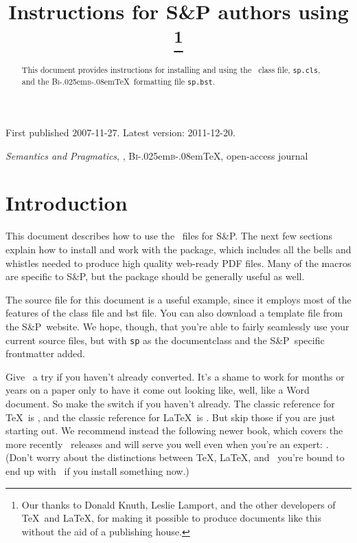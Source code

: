 \documentclass[lucida,final]{sp}
\title[S\&P instructions for \LaTeXe]{Instructions for S\&P authors using \LaTeXe%
  \thanks{Our thanks to Donald Knuth, Leslie
    Lamport, and the other developers of \TeX\ and \LaTeX, for making
    it possible to produce documents like this without the aid of a
    publishing house.}}
\author[von Fintel, Potts \& Shan]{%
  \spauthor{Kai von Fintel \\ \institute{Massachusetts Institute of Technology}} \AND
  \spauthor{Christopher Potts \\ \institute{University of Massachusetts Amherst}} \AND
  \spauthor{Chung-chieh Shan \\ \institute{Rutgers University}}%
}
\makeatletter
\newcommand{\BibTeX}{B{\textsc i\kern-.025em\textsc b}\kern-.08em\TeX}
\newcommand{\SandP}{S\&P\@}
\newcommand{\spfile}[1]{\texttt{#1}}
\makeatother
\begin{document}

\maketitle

\begin{mshistory}
First published 2007-11-27. Latest version: 2011-12-20.
\end{mshistory}

\begin{abstract}  
  This document provides instructions for installing and using the
  \LaTeXe\ class file, \spfile{sp.cls}, and the \BibTeX\ formatting
  file \spfile{sp.bst}.
\end{abstract}

\begin{keywords}
  \emph{Semantics and Pragmatics}, \LaTeXe, \BibTeX, open-access journal
\end{keywords}


\section{Introduction}

This document describes how to use the \LaTeXe\ files for \SandP.  The
next few sections explain how to install and work with the package,
which includes all the bells and whistles needed to produce high
quality web-ready PDF files.  Many of the macros are specific to
\SandP, but the package should be generally useful as well.

The source file for this document is a useful example, since it
employs most of the features of the class file and bst file.  You can
also download a template file from the \SandP\ website.  We hope,
though, that you're able to fairly seamlessly use your current source
files, but with \spfile{sp} as the documentclass and the \SandP\
specific frontmatter added.

Give \LaTeXe\ a try if you haven't already converted.  It's a shame to
work for months or years on a paper only to have it come out looking
like, well, like a Word document.  So make the switch if you haven't
already.  The classic reference for \TeX\ is \citealt{Knuth84TeXBook},
and the classic reference for \LaTeX\ is \citealt{Lamport94}.  But
skip those if you are just starting out.  We recommend instead the
following newer book, which covers the more recently \LaTeXe\ releases
and will serve you well even when you're an expert:
\citealt{KopkaDaly03}.  (Don't worry about the distinctions between
\TeX, \LaTeX, and \LaTeXe\ \dash you're bound to end up with \LaTeXe\ if
you install something now.)
\end{document}
